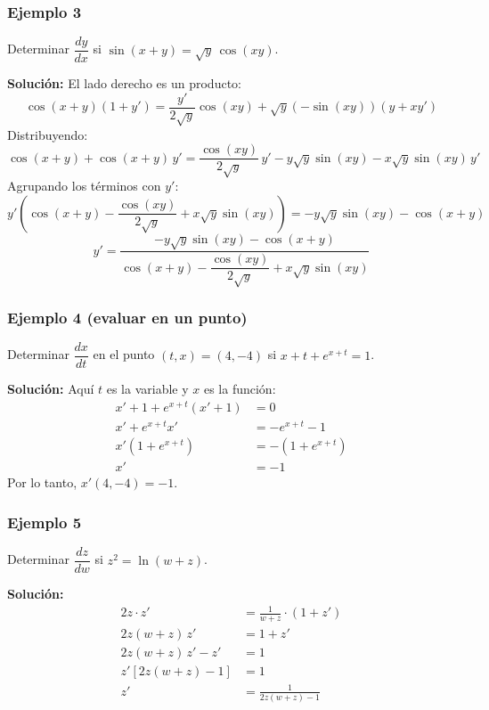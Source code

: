 \documentclass[12pt]{article}
\begin{document}
\subsubsection{Ejemplo 3}


Determinar $\dfrac{dy}{dx}$ si $\sin(x + y) = \sqrt{y}\,\cos(xy)$.

\textbf{Solución:} El lado derecho es un producto:
\[
\cos(x + y)(1 + y') = \frac{y'}{2\sqrt{y}}\cos(xy) + \sqrt{y}\left(-\sin(xy)\right)(y + x y')
\]
Distribuyendo:
\[
\cos(x + y) + \cos(x + y)\,y' = \frac{\cos(xy)}{2\sqrt{y}}\,y' - y\sqrt{y}\sin(xy) - x\sqrt{y}\sin(xy)\,y'
\]
Agrupando los términos con $y'$:
\[
y'\left(\cos(x + y) - \frac{\cos(xy)}{2\sqrt{y}} + x\sqrt{y}\sin(xy)\right) = -y\sqrt{y}\sin(xy) - \cos(x + y)
\]
\[
y' = \frac{-y\sqrt{y}\sin(xy) - \cos(x + y)}{\cos(x + y) - \dfrac{\cos(xy)}{2\sqrt{y}} + x\sqrt{y}\sin(xy)}
\]



\subsubsection{Ejemplo 4 (evaluar en un punto)}


Determinar $\dfrac{dx}{dt}$ en el punto $(t, x) = (4, -4)$ si $x + t + e^{x + t} = 1$.

\textbf{Solución:} Aquí $t$ es la variable y $x$ es la función:
\begin{align*}
x' + 1 + e^{x + t}(x' + 1) &= 0 \\
x' + e^{x + t} x' &= -e^{x + t} - 1 \\
x'\left(1 + e^{x + t}\right) &= -\left(1 + e^{x + t}\right) \\
x' &= -1
\end{align*}
Por lo tanto, $x'(4, -4) = -1$.



\subsubsection{Ejemplo 5}


Determinar $\dfrac{dz}{dw}$ si $z^2 = \ln(w + z)$.

\textbf{Solución:}
\begin{align*}
2z \cdot z' &= \frac{1}{w + z} \cdot (1 + z') \\
2z(w + z)\,z' &= 1 + z' \\
2z(w + z)\,z' - z' &= 1 \\
z'\left[2z(w + z) - 1\right] &= 1 \\
z' &= \frac{1}{2z(w + z) - 1}
\end{align*}
\end{document}
